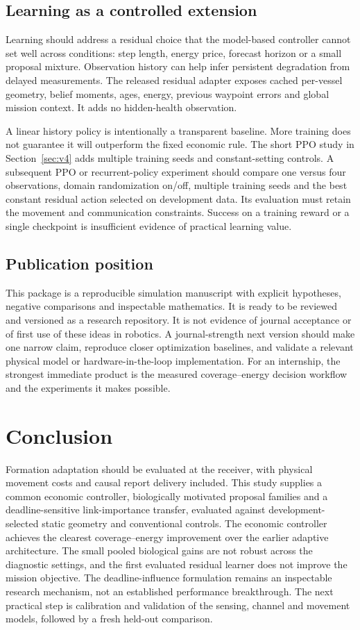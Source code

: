 \subsection{Learning as a controlled extension}
Learning should address a residual choice that the model-based controller
cannot set well across conditions: step length, energy price, forecast horizon
or a small proposal mixture. Observation history can help infer persistent
degradation from delayed measurements. The released residual adapter exposes
cached per-vessel geometry, belief moments, ages, energy, previous waypoint
errors and global mission context. It adds no hidden-health observation.

A linear history policy is intentionally a transparent baseline. More training
does not guarantee it will outperform the fixed economic rule.
The short PPO study in Section~\ref{sec:v4} adds multiple training seeds and constant-setting controls. A subsequent PPO or recurrent-policy experiment should compare one versus four observations,
domain randomization on/off, multiple training seeds and the best constant
residual action selected on development data. Its evaluation must retain the
movement and communication constraints. Success on a training reward or a
single checkpoint is insufficient evidence of practical learning value.

\subsection{Publication position}
This package is a reproducible simulation manuscript with explicit hypotheses,
negative comparisons and inspectable mathematics. It is ready to be reviewed
and versioned as a research repository. It is not evidence of journal acceptance
or of first use of these ideas in robotics. A journal-strength next version
should make one narrow claim, reproduce closer optimization baselines, and
validate a relevant physical model or hardware-in-the-loop implementation.
For an internship, the strongest immediate product is the measured
coverage--energy decision workflow and the experiments it makes possible.

\section{Conclusion}
Formation adaptation should be evaluated at the receiver, with physical movement
costs and causal report delivery included. This study supplies a common economic
controller, biologically motivated proposal families and a deadline-sensitive
link-importance transfer, evaluated against development-selected static geometry
and conventional controls. The economic controller achieves the clearest
coverage--energy improvement over the earlier adaptive architecture. The small
pooled biological gains are not robust across the diagnostic settings, and the
first evaluated residual learner does not improve the mission objective.
The deadline-influence formulation remains an inspectable research mechanism,
not an established performance breakthrough. The next practical step is calibration and validation of the
sensing, channel and movement models, followed by a fresh held-out comparison.
